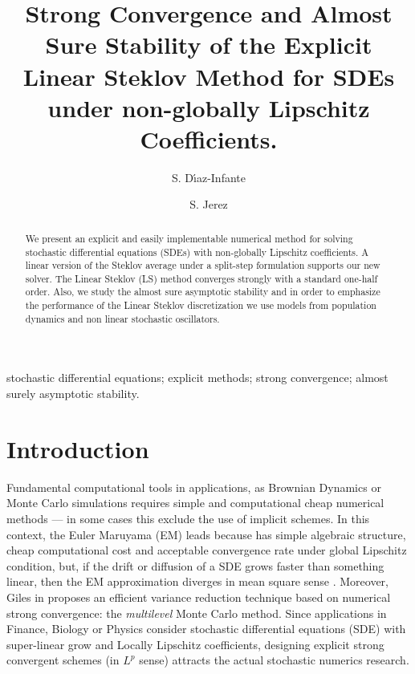 \documentclass[sort&compress, preprint]{elsarticle}
\theoremstyle{definition}
\theoremstyle{plain}%
\theoremstyle{remark}
\newcommand{\SM}{LS\xspace}
\begin{document}
	\begin{frontmatter}
		\title{
				Strong Convergence and Almost Sure Stability of the Explicit Linear Steklov Method
				for SDEs under non-globally Lipschitz Coefficients.
		}%
		\author[sj]{S. D\'{\i}az-Infante}
		\author[sj]{S. Jerez}
		\address[sj]{Split Step Linear Steklov Method 
		Department of Applied Mathematics, CIMAT, Guanajuato, Gto., Mexico,
		36240.
		}
	\begin{abstract}
		We present an explicit and easily implementable numerical method for
		solving stochastic differential equations (SDEs) with non-globally Lipschitz
		coefficients. A linear version of the Steklov average under a split-step formulation supports our new solver.
		The Linear Steklov (\SM) method converges strongly with a standard 
		one-half order.  Also, we study the almost sure asymptotic stability and in  order to emphasize the 
		performance of the Linear Steklov discretization we use models from population dynamics 
		and non linear stochastic oscillators.
	\end{abstract}
	\begin{keyword}
		stochastic differential equations;
		explicit methods; strong convergence; almost surely asymptotic stability.
	\end{keyword}
	\end{frontmatter}

\section{Introduction} 

	Fundamental computational tools in applications,  as Brownian Dynamics \cite{Cruz2012} or Monte Carlo simulations 
\cite{Glasserman2004} requires simple and computational cheap numerical methods  --- 
in some cases this exclude the use of implicit schemes.
In this context, the Euler Maruyama (EM) leads because has simple algebraic structure, 
cheap computational cost and acceptable convergence rate under global Lipschitz condition, but, if the drift or 
diffusion of a SDE grows faster than something linear, then the EM approximation diverges  in mean square sense 
\cite{Hutzenthaler2009, Hutzenthaler2010, Hutzenthaler2012b}.
Moreover, Giles in \cite{Giles2008} proposes an efficient variance reduction technique based on numerical strong 
convergence: the \emph{multilevel}  Monte Carlo method. 
Since applications in Finance, Biology or Physics consider stochastic differential equations (SDE) with super-linear
grow and Locally Lipschitz coefficients, designing explicit strong convergent schemes (in $L^p$ sense)
attracts the actual stochastic numerics research. 
\end{document}
